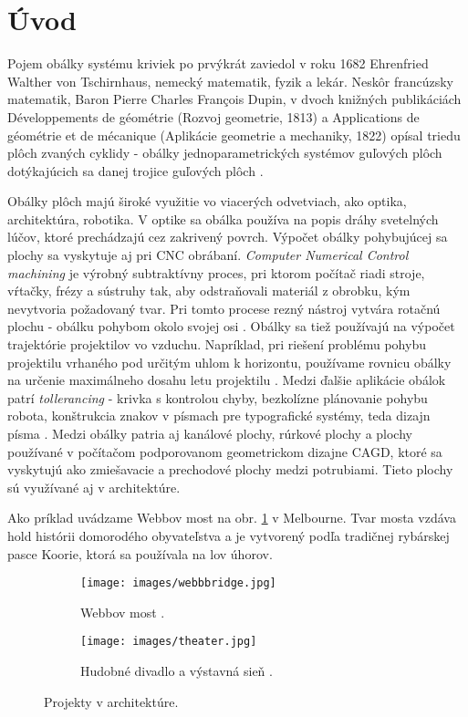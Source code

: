 \chapter*{Úvod} %
Pojem obálky systému kriviek po prvýkrát zaviedol v roku 1682 Ehrenfried Walther von Tschirnhaus, nemecký matematik, fyzik a lekár. Neskôr francúzsky matematik, Baron Pierre Charles François Dupin, v dvoch knižných publikáciách Développements de géométrie (Rozvoj geometrie, 1813) a Applications de géométrie et de mécanique (Aplikácie geometrie a mechaniky, 1822) opísal triedu plôch zvaných cyklidy - obálky jednoparametrických systémov guľových plôch dotýkajúcich sa danej trojice guľových plôch \cite{Ciz2017}.

Obálky plôch majú široké využitie vo viacerých odvetviach, ako optika, architektúra, robotika. V optike sa obálka používa na popis dráhy svetelných lúčov, ktoré prechádzajú cez zakrivený povrch. Výpočet obálky pohybujúcej sa plochy sa vyskytuje aj pri CNC obrábaní. \textit{Computer Numerical Control machining} je výrobný subtraktívny proces, pri ktorom počítač riadi stroje, vŕtačky, frézy a sústruhy tak, aby odstraňovali materiál z obrobku, kým nevytvoria požadovaný tvar. Pri tomto procese rezný nástroj vytvára rotačnú plochu - obálku pohybom okolo svojej osi \cite{Skop20}. Obálky sa tiež používajú na výpočet trajektórie projektilov vo vzduchu. Napríklad, pri riešení problému pohybu projektilu vrhaného pod určitým uhlom k horizontu, používame rovnicu obálky na určenie maximálneho dosahu letu projektilu \cite{Chud09}. Medzi ďalšie aplikácie obálok patrí \textit{tollerancing} - krivka s kontrolou chyby, bezkolízne plánovanie pohybu robota, konštrukcia znakov v písmach pre typografické systémy, teda dizajn písma \cite{Pott09}. Medzi obálky patria aj kanálové plochy, rúrkové plochy a plochy používané v počítačom podporovanom geometrickom dizajne CAGD, ktoré sa vyskytujú ako zmiešavacie a prechodové plochy medzi potrubiami. Tieto plochy sú využívané aj v architektúre.

Ako príklad uvádzame Webbov most na obr. \ref{fig:webb_bridge} v Melbourne. Tvar mosta vzdáva hold histórii domorodého obyvateľstva a je vytvorený podľa tradičnej rybárskej pasce Koorie, ktorá sa používala na lov úhorov.

\begin{figure}[h]
    \centering
    \begin{subfigure}[b]{0.6\textwidth}
        \centering
        \texttt{[image: images/webbbridge.jpg]}
        \caption[Webbov most.]{Webbov most \cite{WebbBridge}.}
        \label{fig:webb_bridge}
    \end{subfigure}
    \hfill
    \begin{subfigure}[b]{0.6\textwidth}
        \centering
        \texttt{[image: images/theater.jpg]}
        \caption[Hudobné divadlo a výstavná sieň.]{Hudobné divadlo a výstavná sieň \cite{MusicTheater}.}
        \label{fig:theater}
    \end{subfigure}
    \caption{Projekty v architektúre.}
    \label{fig:projects}
\end{figure}

